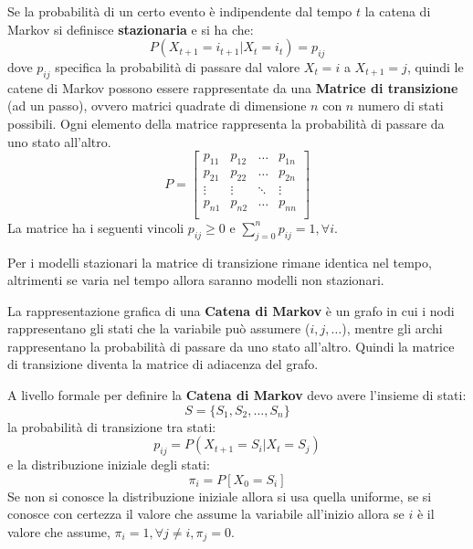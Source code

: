 Se la probabilità di un certo evento è indipendente dal tempo $t$ la catena di
Markov si definisce \textbf{stazionaria} e si ha che:
\begin{equation*}
    P(X_{t+1} = i_{t+1 } | X_t =i_t) = p_{ij}
\end{equation*}
dove $p_{ij}$ specifica la probabilità di passare dal valore $X_t = i$ a $X_{t + 1} = j$,
quindi le catene di Markov possono essere rappresentate da una \textbf{Matrice di
    transizione} (ad un passo), ovvero matrici quadrate di dimensione $n$ con $n$
numero di stati possibili. Ogni elemento della matrice rappresenta la probabilità
di passare da uno stato all'altro.
\begin{equation*}
    P = \begin{bmatrix}
        p_{11} & p_{12} & \dots  & p_{1n} \\
        p_{21} & p_{22} & \dots  & p_{2n} \\
        \vdots & \vdots & \ddots & \vdots \\
        p_{n1} & p_{n2} & \dots  & p_{nn} \\
    \end{bmatrix}
\end{equation*}
La matrice ha i seguenti vincoli $p_{ij} \geq 0$ e $\sum_{j=0}^{n}p_{ij}=1, \forall i$.
\begin{nota}
    Per i modelli stazionari la matrice di transizione rimane identica nel tempo,
    altrimenti se varia nel tempo allora saranno modelli non stazionari.
\end{nota}

La rappresentazione grafica di una \textbf{Catena di Markov} è un grafo in cui i
nodi rappresentano gli stati che la variabile può assumere ($i,j,\dots$), mentre
gli archi rappresentano la probabilità di passare da uno stato all'altro. Quindi
la matrice di transizione diventa la matrice di adiacenza del grafo.

A livello formale per definire la \textbf{Catena di Markov} devo avere l'insieme
di stati:
\begin{equation*}
    S = \{S_1, S_2, \dots, S_n\}
\end{equation*}
la probabilità di transizione tra stati:
\begin{equation*}
    p_{ij} = P(X_{t+1} = S_i | X_t = S_j)
\end{equation*}
e la distribuzione iniziale degli stati:
\begin{equation*}
    \pi_i = P[X_0 = S_i]
\end{equation*}
Se non si conosce la distribuzione iniziale allora si usa quella uniforme, se
si conosce con certezza il valore che assume la variabile all'inizio allora se $i$
è il valore che assume, $\pi_i = 1, \forall j \ne i, \pi_j=0$.


